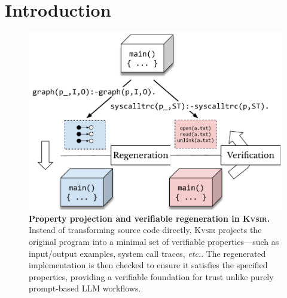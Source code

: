 \documentclass[sigplan,review,anonymous,10pt]{acmart}
\def\etc{{\em etc.}\xspace}
\newcommand{\sys}{{\scshape Kv{\textalpha}sir}\xspace}
\begin{document}
\maketitle

\section{Introduction}
\label{sec:intro}

\begin{figure}[t]
  \includegraphics[width=.7\columnwidth]{figs/kvasir_projection.pdf}
  \caption{\textbf{Property projection and verifiable regeneration in \sys.}
  Instead of transforming source code directly, \sys projects the original
  program into a minimal set of verifiable properties---such as input/output
  examples, system call traces, \etc.
  The regenerated implementation is then checked to
  ensure it satisfies the specified properties, providing a verifiable
  foundation for trust unlike purely prompt-based LLM workflows.}
  \label{fig:projection}
\end{figure}


\end{document}
